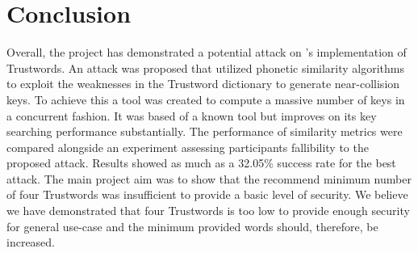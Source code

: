 \chapter{Conclusion}
\label{cha:conclusion}

Overall, the project has demonstrated a potential attack on \pep's implementation of Trustwords. An attack was proposed that utilized phonetic similarity algorithms to exploit the weaknesses in the Trustword dictionary to generate near-collision keys. To achieve this a tool was created to compute a massive number of keys in a concurrent fashion. It was based of a known tool but improves on its key searching performance substantially. The performance of similarity metrics were compared alongside an experiment assessing participants fallibility to the proposed attack. Results showed as much as a 32.05\% success rate for the best attack. The main project aim was to show that the recommend minimum number of four Trustwords was insufficient to provide a basic level of security. We believe we have demonstrated that four Trustwords is too low to provide enough security for general use-case and the minimum provided words should, therefore, be increased.

